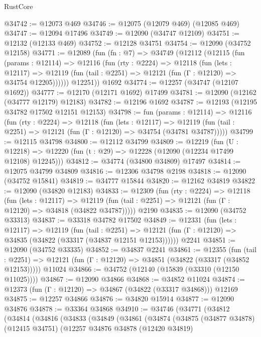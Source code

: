 \begin{lexlean}{RustCore}
\begin{coremodule}
@34742 := @12073 @469
@34746 := @12075 (@12079 @469) (@12085 @469)
@34747 := @12094 @17496
@34749 := @12090 (@34747 @12109)
@34751 := @12132 (@12133 @469)
@34752 := @12128 @34751
@34754 := @12090 (@34752 @12158)
@34771 := @12089
    (fun (fn : @7) =>
    @34749
      (@12112
        (@12115
          (fun (params : @12114) =>
          @12116
            (fun (rty : @2224) =>
            @12118
              (fun (lets : @12117) =>
              @12119 (fun (tail : @2251) => @12121 (fun (Γ : @12120) => @34754 @12205))))))
        @12251))
    @1692
@34774 := @12257 (@34747 (@12107 @1692))
@34777 := @12170 (@12171 @1692) @17499
@34781 := @12090 (@12162 (@34777 @12179) @12183)
@34782 := @12196 @1692
@34787 := @12193 (@12195 @34782 @17502 @12151 @12153)
@34798 := fun (params : @12114) =>
  @12116
    (fun (rty : @2224) =>
    @12118
      (fun (lets : @12117) =>
      @12119 (fun (tail : @2251) => @12121 (fun (Γ : @12120) => @34754 (@34781 @34787)))))
@34799 := @12115 @34798
@34800 := @12112 @34799
@34809 := @12219
    (fun (U : @12218) => @12220 (fun (t : @29) => @12228 (@12090 (@12234 @17499 @12108) @12245)))
@34812 := @34774 (@34800 @34809) @17497
@34814 := @12075 @34799 @34809
@34816 := @12306 @34798 @2198
@34818 := @12090 (@34752 @15841)
@34819 := @34777 @15844
@34820 := @12162 @34819
@34822 := @12090 (@34820 @12183)
@34833 := @12309
    (fun (rty : @2224) =>
    @12118
      (fun (lets : @12117) =>
      @12119 (fun (tail : @2251) => @12121 (fun (Γ : @12120) => @34818 (@34822 @34787)))))
    @2190
@34835 := @12090 (@34752 @33313)
@34837 := @33318 @34782 @17502
@34849 := @12331
    (fun (lets : @12117) =>
    @12119
      (fun (tail : @2251) =>
      @12121 (fun (Γ : @12120) => @34835 (@34822 (@33317 (@34837 @12151 @12153))))))
    @2241
@34851 := @12090 (@34752 @33335)
@34852 := @34837 @2241
@34861 := @12355
    (fun (tail : @2251) => @12121 (fun (Γ : @12120) => @34851 (@34822 (@33317 (@34852 @12153)))))
    @11024
@34866 := @34752 (@12140 (@15839 (@33310 (@12150 @11025))))
@34867 := @12090 @34866
@34868 := @34852 @11024
@34874 := @12373 (fun (Γ : @12120) => @34867 (@34822 (@33317 @34868))) @12169
@34875 := @12257 @34866
@34876 := @34820 @15914
@34877 := @12090 @34876
@34878 := @33364 @34868
@34910 := @34746
    (@34771
      (@34812
        (@34814
          (@34816
            (@34833
              (@34849
                (@34861
                  (@34874
                    (@34875
                      (@34877 @34878)
                      (@12415 @34751)
                      (@12257
                        @34876
                        @34878
                        (@12420 @34819)

\end{coremodule}
\end{lexlean}
